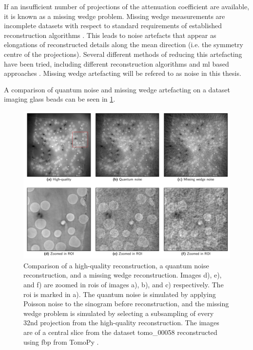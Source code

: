 If an insufficient number of projections of the attenuation coefficient are available, it is known as a missing wedge problem. Missing wedge measurements are incomplete datasets with respect to standard requirements of established reconstruction algorithms \cite{10.1111/jmi.12313}. This leads to noise artefacts that appear as elongations of reconstructed details along the mean direction (i.e. the symmetry centre of the projections). Several different methods of reducing this artefacting have been tried, including different reconstruction algorithms \cite{10.1111/jmi.12313} and \acrshort{ml} based approaches \cite{liu2020tomogan,GANrec}. Missing wedge artefacting will be refered to as noise in this thesis. 

A comparison of quantum noise and missing wedge artefacting on a dataset imaging glass beads can be seen in \cref{fig:noisecomparison}. 

\begin{figure}[htbp]  
    \centering
    \includegraphics[width=.9\textwidth]{figures/noisecomparison.pdf}
    \caption[Reconstruction noise comparison]{Comparison of a high-quality reconstruction, a quantum noise reconstruction, and a missing wedge reconstruction. Images d), e), and f) are zoomed in \acrshort{roi}s of images a), b), and c) respectively. The \acrshort{roi} is marked in a). The quantum noise is simulated by applying Poisson noise to the sinogram before reconstruction, and the missing wedge problem is simulated by selecting a subsampling of every 32nd projection from the high-quality reconstruction. The images are of a central slice from the dataset tomo\_00058 \cite{datasetglassspheres} reconstructed using \acrshort{fbp} from TomoPy \cite{TomoBank}. }
    \label{fig:noisecomparison}
\end{figure}


